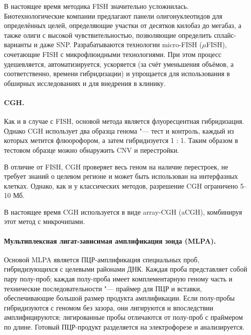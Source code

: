 \documentclass[a4paper,12pt]{article}
\newcommand{\spacing}{\textcolor{red}{\textbf{(разрыв)}}}
\begin{document}
В настоящее время методика FISH значительно усложнилась.
Биотехнологические компании предлагают панели олигонуклеотидов для определённых целей, определяющие участки от десятков килобаз до мегабаз, а также олиги с высокой чувствительностью, позволяющие определить сплайс-варианты и даже SNP.
Разрабатываются технологии micro-FISH ($\mu$FISH), сочетающие FISH с микрофлюидными технологиями.
При этом процесс удешевляется, автоматизируется, ускоряется (за счёт уменьшения объёмов, а соответственно, времени гибридизации) и упрощается для использования в обширных исследованиях и для внедрения в клинику\cite{huber}.

\paragraph{CGH.}
Как и в случае с FISH, основой метода является флуоресцентная гибридизация.
Однако CGH использует два образца генома "--- тест и контроль, каждый из которых метится флюорофором, а затем гибридизуется 1 : 1.
Таким образом в тестовом образце можно обнаружить CNV и перестройки.

В отличие от FISH, CGH проверяет весь геном на наличие перестроек, не требует знаний о целевом регионе и может быть использован на интерфазных клетках.
Однако, как и у классических методов, разрешение CGH ограничено 5--10 Мб.

В настоящее время CGH используется в виде array-CGH (aCGH), комбинируя этот метод с микрочипами\cite{theisen}.


\paragraph{Мультиплексная лигат-зависимая амплификация зонда (MLPA).}
Основой MLPA является ПЦР-амплификация специальных проб, гибридизующихся с целевыми районами ДНК.
Каждая проба представляет собой пару полу-проб;
каждая полу-проба имеет комплементарную геному часть и технические последовательности "--- праймер для ПЦР и вставки, обеспечивающие большой размер продукта амплификации.
Если полу-пробы гибридизуются с геномом без зазора, они лигируются и впоследствии амплифицируются;
лигированные пробы отличаются от полу-проб с праймером по длине.
Готовый ПЦР-продукт разделяется на электрофорезе и анализируется.
\end{document}
